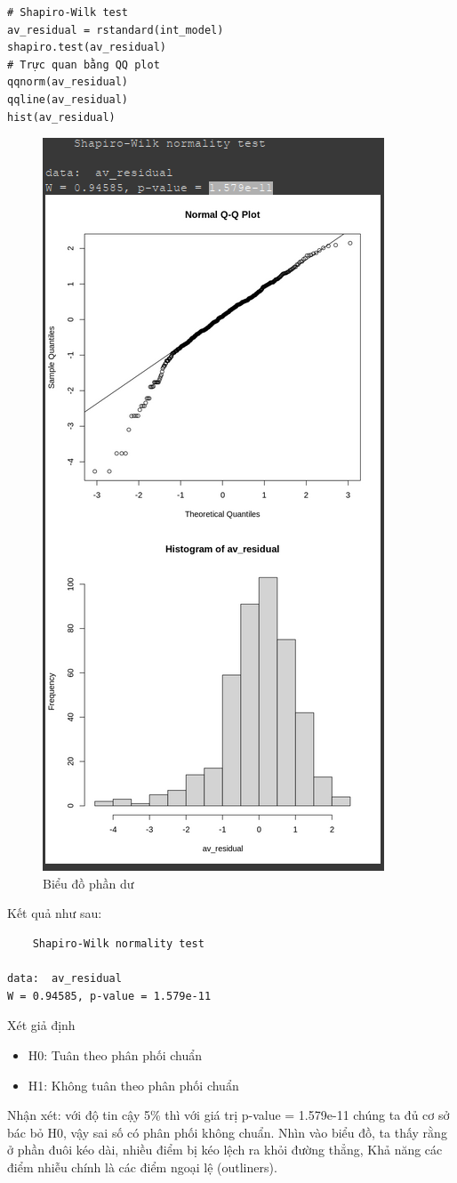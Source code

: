 \begin{itemize}
\begin{lstlisting}
# Shapiro-Wilk test
av_residual = rstandard(int_model)
shapiro.test(av_residual)
# Trực quan bằng QQ plot
qqnorm(av_residual)
qqline(av_residual)
hist(av_residual)
\end{lstlisting}
\begin{figure}[H]
    \centering
    \includegraphics[width=0.5\linewidth]{part23_figures/06.png}
    \caption{Biểu đồ phần dư}
    \label{fig:Biểu đồ phần dư_}
\end{figure}

\newpage
Kết quả như sau:
\begin{lstlisting}
	Shapiro-Wilk normality test

data:  av_residual
W = 0.94585, p-value = 1.579e-11
\end{lstlisting}

Xét giả định
\begin{itemize}
    \item H0: Tuân theo phân phối chuẩn
    \item H1: Không tuân theo phân phối chuẩn
\end{itemize}

Nhận xét: với độ tin cậy 5\% thì với giá trị p-value = 1.579e-11 chúng ta đủ cơ sở bác bỏ H0, vậy sai số có phân phối không chuẩn. Nhìn vào biểu đồ, ta thấy rằng ở phần đuôi kéo dài, nhiều điểm bị kéo lệch ra khỏi đường thẳng,  Khả năng các điểm nhiễu chính là các điểm ngoại lệ (outliners).


\end{itemize}
